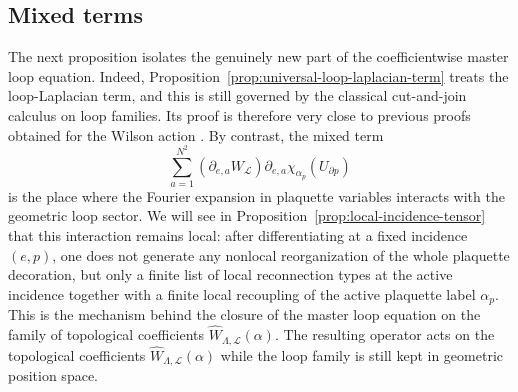 \documentclass[11pt,a4paper,reqno]{article}
\theoremstyle{definition}
\theoremstyle{remark}
\newcommand\Lc{{\mathcal{L}}}
\begin{document}
\subsection{Mixed terms}

The next proposition isolates the genuinely new part of the coefficientwise master loop equation. Indeed, Proposition~\ref{prop:universal-loop-laplacian-term} treats the loop-Laplacian term, and this is still governed by the classical cut-and-join calculus on loop families. Its proof is therefore very close to previous proofs obtained for the Wilson action \cite{Cha19,Jaf16,SSZ24}. By contrast, the mixed term
\[
\sum_{a=1}^{N^2} (\partial_{e,a}W_{\Lc})\partial_{e,a}\chi_{\alpha_p}(U_{\partial p})
\]
is the place where the Fourier expansion in plaquette variables interacts with the geometric loop sector. We will see in Proposition~\ref{prop:local-incidence-tensor} that this interaction remains local: after differentiating at a fixed incidence $(e,p)$, one does not generate any nonlocal reorganization of the whole plaquette decoration, but only a finite list of local reconnection types at the active incidence together with a finite local recoupling of the active plaquette label $\alpha_p$. This is the mechanism behind the closure of the master loop equation on the family of topological coefficients $\widehat{W}_{\Lambda,\Lc}(\alpha)$. The resulting operator acts on the topological coefficients $\widehat{W}_{\Lambda,\Lc}(\alpha)$ while the loop family is still kept in geometric position space.
\end{document}

